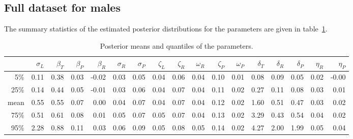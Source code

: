 \documentclass[12pt]{article}
\begin{document}
\subsection*{Full dataset for males}

The summary statistics of the estimated posterior distributions 
for the parameters
are given in table~\ref{tab:posterior_distrns}.

\begin{table}[ht]
    \footnotesize
\centering
\begin{tabular}{rrrrrrrrrrrrrrrrr}
  \hline
        &  $\sigma_L$  &  $\beta_T$  &  $\beta_P$  &  $\beta_R$  &  $\sigma_R$  &  $\sigma_P$  &  $\zeta_L$  &  $\zeta_R$  &  $\omega_R$  &  $\zeta_P$  &  $\omega_P$  &  $\delta_T$  &  $\delta_R$  &  $\delta_P$  &  $\eta_R$  &  $\eta_P$  \\
\hline
5\%     &  0.11        &  0.38       &  0.03       &  -0.02      &  0.03        &  0.05        &  0.04       &  0.06       &  0.04        &  0.10       &  0.01        &  0.08        &  0.09        &  0.05        &  0.02      &  -0.00     \\
25\%    &  0.14        &  0.44       &  0.05       &  -0.01      &  0.03        &  0.06        &  0.04       &  0.07       &  0.04        &  0.11       &  0.02        &  0.27        &  0.11        &  0.08        &  0.03      &  0.01      \\
mean    &  0.55        &  0.55       &  0.07       &  0.00       &  0.04        &  0.07        &  0.04       &  0.07       &  0.04        &  0.12       &  0.02        &  1.60        &  0.51        &  0.47        &  0.03      &  0.02      \\
75\%    &  0.51        &  0.61       &  0.08       &  0.01       &  0.05        &  0.07        &  0.05       &  0.07       &  0.04        &  0.13       &  0.02        &  3.29        &  0.43        &  0.54        &  0.04      &  0.02      \\
95\%    &  2.28        &  0.88       &  0.11       &  0.03       &  0.06        &  0.09        &  0.05       &  0.08       &  0.05        &  0.14       &  0.02        &  4.27        &  2.00        &  1.99        &  0.05      &  0.04      \\
   \hline
\end{tabular}
\caption{ \label{tab:posterior_distrns} Posterior means and quantiles of the parameters.  }
\end{table}
\end{document}

